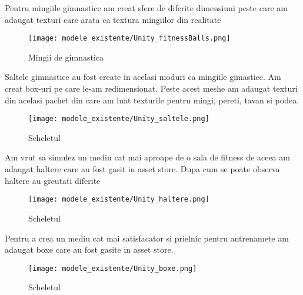 \documentclass[12pt,a4paper]{report}
\begin{document}
Pentru mingiile gimnastice am creat sfere de diferite dimensiuni peste care am adaugat texturi care arata ca textura mingiilor din realitate

\begin{figure}[th]
\centering
\texttt{[image: modele\_existente/Unity\_fitnessBalls.png]} \caption[Mingii de gimnastica]{Mingii de gimnastica\protect\footnotemark}
  \label{figure_1:picture_10}
\end{figure}

\newpage
Saltele gimnastice au fost create in acelasi moduri ca mingiile gimastice. Am creat box-uri pe care le-am redimensionat. Peste acest meshe am adaugat texturi din acelasi pachet din care am luat texturile pentru mingi, pereti, tavan si podea.

\begin{figure}[th]
\centering
\texttt{[image: modele\_existente/Unity\_saltele.png]} \caption[Scheletul]{Scheletul\protect\footnotemark}
  \label{figure_1:picture_10}
\end{figure}

\newpage

Am vrut sa simulez un mediu cat mai aproape de o sala de fitness de aceea am adaugat haltere care au fost gasit in asset store. Dupa cum se poate observa haltere au greutati diferite

\begin{figure}[th]
\centering
\texttt{[image: modele\_existente/Unity\_haltere.png]} \caption[Scheletul]{Scheletul\protect\footnotemark}
  \label{figure_1:picture_10}
\end{figure}

Pentru a crea un mediu cat mai satisfacator si prielnic pentru antrenamete am adaugat boxe care au fost gasite in asset store.%

\begin{figure}[th]
\centering
\texttt{[image: modele\_existente/Unity\_boxe.png]} \caption[Scheletul]{Scheletul\protect\footnotemark}
  \label{figure_1:picture_10}
\end{figure}


\end{document}
